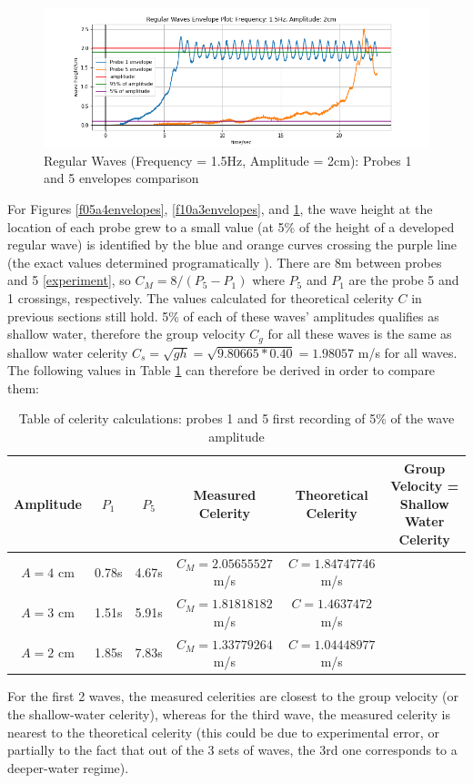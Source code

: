 \documentclass{article}
\begin{document}
	\vspace{-.5cm}
	\begin{figure}[H]
		\centering
		\includegraphics[clip, trim = {1cm 0.1cm 1cm 0.5cm},width=\textwidth]{../graphs/F15A2Probes1and5Envelope.png}
		\caption{Regular Waves (Frequency = 1.5Hz, Amplitude = 2cm): Probes 1 and 5 envelopes comparison}
		\label{f15a2envelopes}
	\end{figure}
	For Figures \ref{f05a4envelopes}, \ref{f10a3envelopes}, and \ref{f15a2envelopes}, the wave height at the location of each probe grew to a small value (at 5\% of the height of a developed regular wave) is identified by the blue and orange curves crossing the purple line (the exact values determined programatically \cite{code}). There are 8m between probes and 5 \ref{experiment}, so $C_M = 8/(P_5 - P_1)$ where $P_5$ and $P_1$ are the probe 5 and 1 crossings, respectively. The values calculated for theoretical celerity $C$ in previous sections still hold. 
	5\% of each of these waves' amplitudes qualifies as shallow water, therefore the group velocity $C_g$ for all these waves is  the same as shallow water celerity $C_s = \sqrt{gh} = \sqrt{9.80665 * 0.40} = 1.98057$ m/s for all waves.\\
	The following values in Table \ref{smallwavefronttable} can therefore be derived in order to compare them:\\
	\begin{table}[H]
		\centering
		\begin{tabular}{|c|c|c|c|c|c|}
			\hline
			Amplitude & \textbf{$P_1$} & \textbf{$P_5$} & \textbf{Measured Celerity} & Theoretical Celerity & Group Velocity  = Shallow Water Celerity\\ \hline
			$A = 4$ cm & 0.78s & 4.67s & $C_M = 2.05655527$ m/s & $C = 1.84747746$ m/s & {\multirow{3}{*}{$C_g = C_s = 1.98057$ m/s}}\\ \cline{1-5}
			$A = 3$ cm & 1.51s & 5.91s & $C_M = 1.81818182$ m/s & $C = 1.4637472$ m/s & {} \\ \cline{1-5}
			$A = 2$ cm & 1.85s & 7.83s & $C_M = 1.33779264$ m/s & $C = 1.04448977$ m/s & {} \\ \hline
		\end{tabular}
		\caption{Table of celerity calculations: probes 1 and 5 first recording of 5\% of the wave amplitude}
		\label{smallwavefronttable}
	\end{table}
	For the first 2 waves, the measured celerities are closest to the group velocity (or the shallow-water celerity), whereas for the third wave, the measured celerity is nearest to the theoretical celerity (this could be due to experimental error, or partially to the fact that out of the 3 sets of waves, the 3rd one corresponds to a deeper-water regime).
\end{document}
